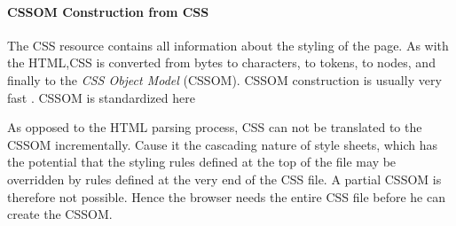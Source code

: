 






\paragraph{CSSOM Construction from CSS}



The CSS resource contains all information about the styling of the page.
As with the HTML,CSS is converted from bytes to characters, to tokens, to nodes, and finally to the \textit{CSS Object Model} (CSSOM). %
CSSOM construction is usually very fast . %
CSSOM is standardized here %





As opposed to the HTML parsing process, CSS can not be translated to the CSSOM incrementally.
Cause it the cascading nature of style sheets, which has the potential that the styling rules defined at the top of the file may be overridden by rules defined at the very end of the CSS file.
A partial CSSOM is therefore not possible.
Hence the browser needs the entire CSS file before he can create the CSSOM.


